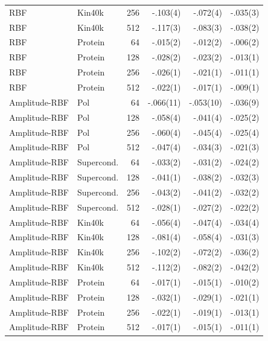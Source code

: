 \begin{table}[!ht]
\begin{tabular}{@{}llrrrr@{}}
RBF & Kin40k & 256 & -.103(4) & -.072(4) & -.035(3) \\
RBF & Kin40k & 512 & -.117(3) & -.083(3) & -.038(2) \\
\addlinespace[1pt]
RBF & Protein & 64 & -.015(2) & -.012(2) & -.006(2) \\
RBF & Protein & 128 & -.028(2) & -.023(2) & -.013(1) \\
RBF & Protein & 256 & -.026(1) & -.021(1) & -.011(1) \\
RBF & Protein & 512 & -.022(1) & -.017(1) & -.009(1) \\
\addlinespace[1pt]
Amplitude-RBF & Pol & 64 & -.066(11) & -.053(10) & -.036(9) \\
Amplitude-RBF & Pol & 128 & -.058(4) & -.041(4) & -.025(2) \\
Amplitude-RBF & Pol & 256 & -.060(4) & -.045(4) & -.025(4) \\
Amplitude-RBF & Pol & 512 & -.047(4) & -.034(3) & -.021(3) \\
\addlinespace[1pt]
Amplitude-RBF & Supercond. & 64 & -.033(2) & -.031(2) & -.024(2) \\
Amplitude-RBF & Supercond. & 128 & -.041(1) & -.038(2) & -.032(3) \\
Amplitude-RBF & Supercond. & 256 & -.043(2) & -.041(2) & -.032(2) \\
Amplitude-RBF & Supercond. & 512 & -.028(1) & -.027(2) & -.022(2) \\
\addlinespace[1pt]
Amplitude-RBF & Kin40k & 64 & -.056(4) & -.047(4) & -.034(4) \\
Amplitude-RBF & Kin40k & 128 & -.081(4) & -.058(4) & -.031(3) \\
Amplitude-RBF & Kin40k & 256 & -.102(2) & -.072(2) & -.036(2) \\
Amplitude-RBF & Kin40k & 512 & -.112(2) & -.082(2) & -.042(2) \\
\addlinespace[1pt]
Amplitude-RBF & Protein & 64 & -.017(1) & -.015(1) & -.010(2) \\
Amplitude-RBF & Protein & 128 & -.032(1) & -.029(1) & -.021(1) \\
Amplitude-RBF & Protein & 256 & -.022(1) & -.019(1) & -.013(1) \\
Amplitude-RBF & Protein & 512 & -.017(1) & -.015(1) & -.011(1) \\
\bottomrule
\end{tabular}
\end{table}
